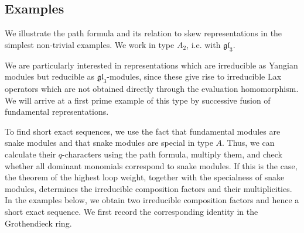 \documentclass[12pt,reqno]{amsart}
\numberwithin{equation}{section}
\begin{document}
\subsection{Examples}
We illustrate the path formula and its relation to skew representations in the simplest non-trivial examples. We work in type $A_2$, i.e. with $\mathfrak{gl}_3$.

We are particularly interested in representations which are irreducible as Yangian modules but reducible as $\mathfrak{gl}_3$-modules, since these give rise to irreducible Lax operators which are not obtained directly through the evaluation homomorphism. We will arrive at a first prime example of this type by successive fusion of fundamental representations.

To find short exact sequences, we use the fact that fundamental
modules are snake modules and that snake modules are special
in type $A$. Thus, we can calculate their $q$-characters using
the path formula, multiply them, and check whether all dominant
monomials correspond to snake modules. If this is the case,
the theorem of the highest loop weight, together with the
specialness of snake modules, determines the irreducible
composition factors and their multiplicities. In the examples
below, we obtain two irreducible composition factors and hence
a short exact sequence. We first record the corresponding
identity in the Grothendieck ring.
\end{document}
